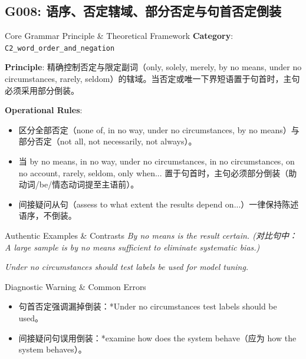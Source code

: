\subsection{G008: 语序、否定辖域、部分否定与句首否定倒装}\label{sec:rule:G008}
\begin{ConceptBox}{Core Grammar Principle \& Theoretical Framework}
\textbf{Category}: \texttt{C2\_word\_order\_and\_negation}\par\vspace{3pt}
\textbf{Principle}: 精确控制否定与限定副词（only, solely, merely, by no means, under no circumstances, rarely, seldom）的辖域。当否定或唯一下界短语置于句首时，主句必须采用部分倒装。\par\vspace{4pt}
\textbf{Operational Rules}:
\begin{itemize}[leftmargin=1.5em, itemsep=1pt]
  \item 区分全部否定（none of, in no way, under no circumstances, by no means）与部分否定（not all, not necessarily, not always）。
  \item 当 by no means, in no way, under no circumstances, in no circumstances, on no account, rarely, seldom, only when... 置于句首时，主句必须部分倒装（助动词/be/情态动词提至主语前）。
  \item 间接疑问从句（assess to what extent the results depend on...）一律保持陈述语序，不倒装。
\end{itemize}
\end{ConceptBox}
\begin{ExampleBox}{Authentic Examples \& Contrasts}
\textit{By no means is the result certain. (对比句中：A large sample is by no means sufficient to eliminate systematic bias.)}\par\vspace{2pt}
\textit{Under no circumstances should test labels be used for model tuning.}\par\vspace{2pt}
\end{ExampleBox}
\begin{TipBox}{Diagnostic Warning \& Common Errors}
\begin{itemize}[leftmargin=1.5em, itemsep=1pt]
  \item 句首否定强调漏掉倒装：*Under no circumstances test labels should be used。
  \item 间接疑问句误用倒装：*examine how does the system behave（应为 how the system behaves）。
\end{itemize}
\end{TipBox}
\vspace{6pt}
